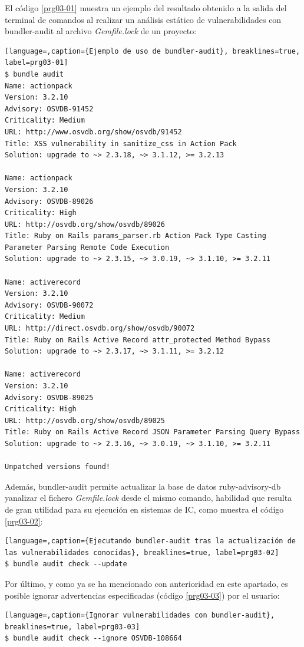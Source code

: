 El código \ref{prg03-01} muestra un ejemplo del resultado obtenido a la salida del terminal de comandos al realizar un análisis estático de vulnerabilidades con bundler-audit al archivo \textit{Gemfile.lock} de un proyecto:

\begin{lstlisting}[language=,caption={Ejemplo de uso de bundler-audit}, breaklines=true, label=prg03-01]
$ bundle audit
Name: actionpack
Version: 3.2.10
Advisory: OSVDB-91452
Criticality: Medium
URL: http://www.osvdb.org/show/osvdb/91452
Title: XSS vulnerability in sanitize_css in Action Pack
Solution: upgrade to ~> 2.3.18, ~> 3.1.12, >= 3.2.13

Name: actionpack
Version: 3.2.10
Advisory: OSVDB-89026
Criticality: High
URL: http://osvdb.org/show/osvdb/89026
Title: Ruby on Rails params_parser.rb Action Pack Type Casting Parameter Parsing Remote Code Execution
Solution: upgrade to ~> 2.3.15, ~> 3.0.19, ~> 3.1.10, >= 3.2.11

Name: activerecord
Version: 3.2.10
Advisory: OSVDB-90072
Criticality: Medium
URL: http://direct.osvdb.org/show/osvdb/90072
Title: Ruby on Rails Active Record attr_protected Method Bypass
Solution: upgrade to ~> 2.3.17, ~> 3.1.11, >= 3.2.12

Name: activerecord
Version: 3.2.10
Advisory: OSVDB-89025
Criticality: High
URL: http://osvdb.org/show/osvdb/89025
Title: Ruby on Rails Active Record JSON Parameter Parsing Query Bypass
Solution: upgrade to ~> 2.3.16, ~> 3.0.19, ~> 3.1.10, >= 3.2.11

Unpatched versions found!
\end{lstlisting}

Además, bundler-audit permite actualizar la base de datos ruby-advisory-db yanalizar el fichero \textit{Gemfile.lock} desde el mismo comando, habilidad que resulta de gran utilidad para su ejecución en sistemas de \gls{IC}, como muestra el código \ref{prg03-02}:

\begin{lstlisting}[language=,caption={Ejecutando bundler-audit tras la actualización de las vulnerabilidades conocidas}, breaklines=true, label=prg03-02]
$ bundle audit check --update
\end{lstlisting}

Por último, y como ya se ha mencionado con anterioridad en este apartado, es posible ignorar advertencias especificadas (código \ref{prg03-03}) por el usuario:

\begin{lstlisting}[language=,caption={Ignorar vulnerabilidades con bundler-audit}, breaklines=true, label=prg03-03]
$ bundle audit check --ignore OSVDB-108664
\end{lstlisting}


